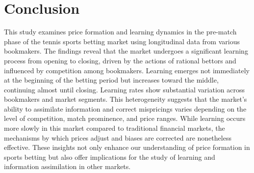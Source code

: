 \documentclass[webpdf,modern,medium]{oup-authoring-template}
\theoremstyle{thmstyleone}%
\theoremstyle{thmstyletwo}%
\theoremstyle{thmstylethree}%
\begin{document}
\section{Conclusion}

    This study examines price formation and learning dynamics in the pre-match phase of the tennis sports betting market using longitudinal data from various bookmakers. The findings reveal that the market undergoes a significant learning process from opening to closing, driven by the actions of rational bettors and influenced by competition among bookmakers. Learning emerges not immediately at the beginning of the betting period but increases toward the middle, continuing almost until closing.
    Learning rates show substantial variation across bookmakers and market segments. This heterogeneity suggests that the market’s ability to assimilate information and correct mispricings varies depending on the level of competition, match prominence, and price ranges. While learning occurs more slowly in this market compared to traditional financial markets, the mechanisms by which prices adjust and biases are corrected are nonetheless effective. These insights not only enhance our understanding of price formation in sports betting but also offer implications for the study of learning and information assimilation in other markets.






\end{document}
